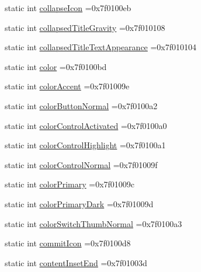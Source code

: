\begin{DoxyCompactItemize}
\item 
static int \hyperlink{classandroid_1_1support_1_1v7_1_1appcompat_1_1R_1_1attr_a8a292560ceb637b93ed32829f1aa456d}{collapse\+Icon} =0x7f0100eb
\item 
static int \hyperlink{classandroid_1_1support_1_1v7_1_1appcompat_1_1R_1_1attr_a16879d02e8655519f27ea1d008c230e4}{collapsed\+Title\+Gravity} =0x7f010108
\item 
static int \hyperlink{classandroid_1_1support_1_1v7_1_1appcompat_1_1R_1_1attr_af75636f95be73b48d5c2fc97f0f5cba5}{collapsed\+Title\+Text\+Appearance} =0x7f010104
\item 
static int \hyperlink{classandroid_1_1support_1_1v7_1_1appcompat_1_1R_1_1attr_a0711bae987f6ffaba425e74b5fc2af92}{color} =0x7f0100bd
\item 
static int \hyperlink{classandroid_1_1support_1_1v7_1_1appcompat_1_1R_1_1attr_a46fb9e9ac72cb8a9a5ec1f8677330f26}{color\+Accent} =0x7f01009e
\item 
static int \hyperlink{classandroid_1_1support_1_1v7_1_1appcompat_1_1R_1_1attr_a8ff054167c209f5d016ea6c4c3ed9ddb}{color\+Button\+Normal} =0x7f0100a2
\item 
static int \hyperlink{classandroid_1_1support_1_1v7_1_1appcompat_1_1R_1_1attr_a11bce689ca9ed11c9c96757895cebcff}{color\+Control\+Activated} =0x7f0100a0
\item 
static int \hyperlink{classandroid_1_1support_1_1v7_1_1appcompat_1_1R_1_1attr_a81fd6db47694d2d9f1c8ce4109695892}{color\+Control\+Highlight} =0x7f0100a1
\item 
static int \hyperlink{classandroid_1_1support_1_1v7_1_1appcompat_1_1R_1_1attr_a417dcb097ebfc94abe730fdbe0a8b424}{color\+Control\+Normal} =0x7f01009f
\item 
static int \hyperlink{classandroid_1_1support_1_1v7_1_1appcompat_1_1R_1_1attr_ac308ca56c74b10e8e633ed6f3e0d7cdc}{color\+Primary} =0x7f01009c
\item 
static int \hyperlink{classandroid_1_1support_1_1v7_1_1appcompat_1_1R_1_1attr_a0efae796c8c67d83a21ff5aeb199c447}{color\+Primary\+Dark} =0x7f01009d
\item 
static int \hyperlink{classandroid_1_1support_1_1v7_1_1appcompat_1_1R_1_1attr_a4db6b3cd94eafb766c1d4a6c42239dc5}{color\+Switch\+Thumb\+Normal} =0x7f0100a3
\item 
static int \hyperlink{classandroid_1_1support_1_1v7_1_1appcompat_1_1R_1_1attr_ad9135efd389d1f3758191b4d2f193530}{commit\+Icon} =0x7f0100d8
\item 
static int \hyperlink{classandroid_1_1support_1_1v7_1_1appcompat_1_1R_1_1attr_a0de2c511147e44102ccb77312c667d73}{content\+Inset\+End} =0x7f01003d

\end{DoxyCompactItemize}
